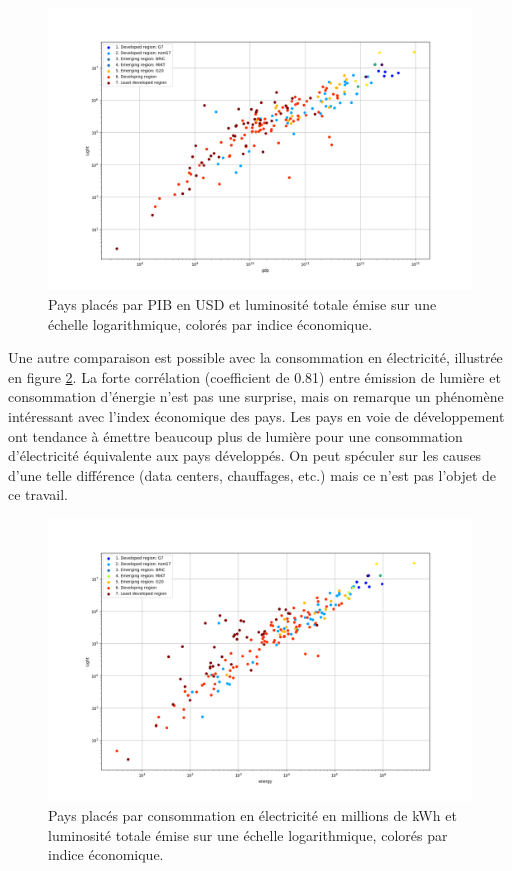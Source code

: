 \documentclass[a4paper, 11pt]{report}
\begin{document}
\begin{figure}
	\centering
	\includegraphics[width=1.0\textwidth]{img/gdp-light.png}
	\caption{Pays placés par PIB en USD et luminosité totale émise sur une échelle logarithmique, colorés par indice économique.}
	\label{country_gdppop_scatter}
\end{figure}

Une autre comparaison est possible avec la consommation en électricité, illustrée en figure \ref{country_energypop_scatter}. La forte corrélation (coefficient de 0.81) entre émission de lumière et consommation d'énergie n'est pas une surprise, mais on remarque un phénomène intéressant avec l'index économique des pays. Les pays en voie de développement ont tendance à émettre beaucoup plus de lumière pour une consommation d'électricité équivalente aux pays développés. On peut spéculer sur les causes d'une telle différence (data centers, chauffages, etc.) mais ce n'est pas l'objet de ce travail.

\begin{figure}
	\centering
	\includegraphics[width=1.0\textwidth]{img/energy-light.png}
	\caption{Pays placés par consommation en électricité en millions de kWh et luminosité totale émise sur une échelle logarithmique, colorés par indice économique.}
	\label{country_energypop_scatter}
\end{figure}
\end{document}
